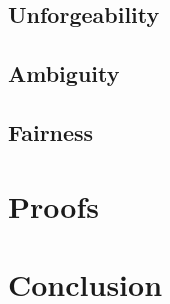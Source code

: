 \documentclass{beamer}
\begin{document}
\subsection{Unforgeability}


\subsection{Ambiguity}


\subsection{Fairness}


\section{Proofs}


\section{Conclusion}

\end{document}
